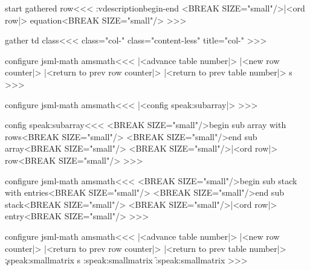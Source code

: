 {\<start gathered row\><<<
\add:vdescription{begin-end}{%
   <BREAK SIZE="small"/>|<ord row|> equation<BREAK SIZE="small"/>}%
>>>


\<gather td class\><<< 
\ifnum {}   class="col-\HCol"
\else            class="content-less" title="col-\HCol"
\fi
>>>


\<configure jsml-math amsmath\><<<
   {|<advance table number|>%
    |<new row counter|>%
    }
   {%
    |<return to prev row counter|>%
    |<return to prev table number|>}
   {} 
   {\xdef\hrow:s{\HRow}}
>>>

\<configure jsml-math amsmath\><<<
|<config speak:subarray|>
>>>

\<config speak:subarray\><<<
   {<BREAK SIZE="small"/>begin sub array with
         rows<BREAK SIZE="small"/>}
   {<BREAK SIZE="small"/>end sub array<BREAK SIZE="small"/>}
   {<BREAK SIZE="small"/>|<ord row|> row<BREAK SIZE="small"/>}
>>>












\<configure jsml-math amsmath\><<<
   {\bgroup
      {<BREAK SIZE="small"/>begin sub stack with
            entries<BREAK SIZE="small"/>}
      {<BREAK SIZE="small"/>end sub stack<BREAK SIZE="small"/>}
      {<BREAK SIZE="small"/>|<ord row|>
             entry<BREAK SIZE="small"/>}
   }
   {\egroup} 
>>>















\<configure jsml-math amsmath\><<<
   {|<advance table number|>%
    |<new row counter|>%
    }
   {\Tag{smallmatrix-\TableNo}{\hrow:s}%
    \ifvmode \IgnorePar\fi 
    |<return to prev row counter|>%
    |<return to prev table number|>}
   {\c:speak:smallmatrix}%
   {\xdef\hrow:s{\HRow}}%
   {%
    \e:speak:smallmatrix }
   {\f:speak:smallmatrix
    }
>>>









}
